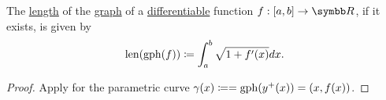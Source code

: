 \begin{Corollary}\label{thm:length_of_function_graph}
  The \hyperref[def:length_of_parametric_curve]{length} of the \hyperref[def:function/graph]{graph} of a \hyperref[def:differentiability/frechet]{differentiable} function \( f: [a, b] \to \BR \), if it exists, is given by
  \begin{equation*}
    \operatorname{len}(\operatorname{gph}(f)) \coloneqq \int_a^b \sqrt{1 + f'(x)} dx.
  \end{equation*}
\end{Corollary}
\begin{proof}
  Apply  for the parametric curve \( \gamma(x) \coloneqq = \operatorname{gph}(y^+(x)) = (x, f(x)) \).
\end{proof}
